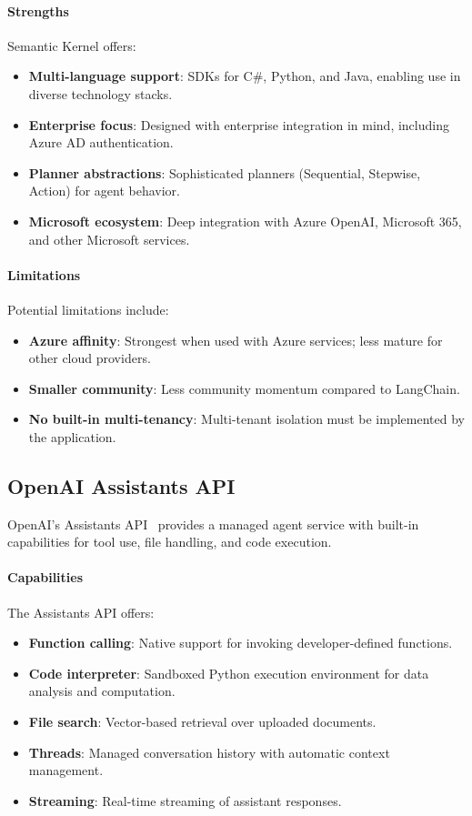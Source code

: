 \documentclass[a4paper,twoside]{sapthesis}
\begin{document}
\paragraph{Strengths}
Semantic Kernel offers:
\begin{itemize}
    \item \textbf{Multi-language support}: SDKs for C\#, Python, and Java, enabling use in diverse technology stacks.
    \item \textbf{Enterprise focus}: Designed with enterprise integration in mind, including Azure AD authentication.
    \item \textbf{Planner abstractions}: Sophisticated planners (Sequential, Stepwise, Action) for agent behavior.
    \item \textbf{Microsoft ecosystem}: Deep integration with Azure OpenAI, Microsoft 365, and other Microsoft services.
\end{itemize}

\paragraph{Limitations}
Potential limitations include:
\begin{itemize}
    \item \textbf{Azure affinity}: Strongest when used with Azure services; less mature for other cloud providers.
    \item \textbf{Smaller community}: Less community momentum compared to LangChain.
    \item \textbf{No built-in multi-tenancy}: Multi-tenant isolation must be implemented by the application.
\end{itemize}

\subsection{OpenAI Assistants API}

OpenAI's Assistants API~\cite{openai2023assistants}
provides a managed agent service with built-in capabilities for tool use, file handling, and code execution.

\paragraph{Capabilities}
The Assistants API offers:
\begin{itemize}
    \item \textbf{Function calling}: Native support for invoking developer-defined functions.
    \item \textbf{Code interpreter}: Sandboxed Python execution environment for data analysis and computation.
    \item \textbf{File search}: Vector-based retrieval over uploaded documents.
    \item \textbf{Threads}: Managed conversation history with automatic context management.
    \item \textbf{Streaming}: Real-time streaming of assistant responses.
\end{itemize}
\end{document}
